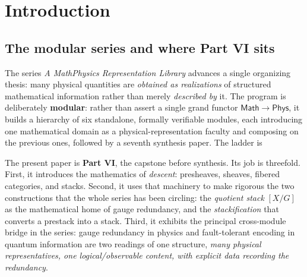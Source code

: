 \documentclass[12pt]{article}
\theoremstyle{definition}
\theoremstyle{remark}
\newcommand{\Math}{\mathsf{Math}}
\newcommand{\Phys}{\mathsf{Phys}}
\newcommand{\quot}[2]{[#1/#2]}
\newcommand{\MtoP}{Math\textrightarrow{}Physics}
\begin{document}
\tableofcontents

\section{Introduction}
\label{sec:intro}

\subsection{The modular series and where Part VI sits}

The series \emph{A \MtoP{} Representation Library} advances a single
organizing thesis: many physical quantities are \emph{obtained as realizations}
of structured mathematical information rather than merely \emph{described by} it. The program is deliberately \textbf{modular}: rather than assert a single
grand functor $\Math\to\Phys$, it builds a hierarchy of six standalone, formally
verifiable modules, each introducing one mathematical domain as a
physical-representation faculty and composing on the previous ones, followed by a
seventh synthesis paper. The ladder is
\begin{center}
\end{center}
The present paper is \textbf{Part VI}, the capstone before synthesis. Its job is
threefold. First, it introduces the mathematics of \emph{descent}: presheaves,
sheaves, fibered categories, and stacks. Second, it uses that machinery to make
rigorous the two constructions that the whole series has been circling: the
\emph{quotient stack} $\quot{X}{G}$ as the mathematical home of gauge redundancy, and
the \emph{stackification} that converts a prestack into a stack. Third, it exhibits
the principal cross-module bridge in the series: gauge redundancy in physics and
fault-tolerant encoding in quantum information are two readings of one structure,
\emph{many physical representatives, one logical/observable content, with explicit
data recording the redundancy}.
\end{document}
